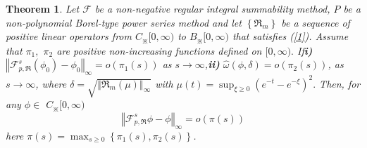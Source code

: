 \documentclass{amsart}
\newtheorem{theorem}{Theorem}
\theoremstyle{plain}
\numberwithin{equation}{section}
\begin{document}
\begin{theorem}
\label{rate2} Let $\mathcal{F}
$ be a non-negative regular integral summability method, $P$ be a non-polynomial Borel-type power series method and let $\left\{  \Re_{m}\right\}
$ be a sequence of positive linear operators from $C_{\divideontimes}%
[0,\infty)$ to $B_{\divideontimes}[0,\infty)$ that satisfies (\ref{1}). Assume
that $\pi_{1},$ $\pi_{2}$ are positive non-increasing functions defined
on $[0,\infty).$ If\newline \textbf{i)} $\left \Vert
\mathcal{F}
_{p,\Re}^{s}\left(  \phi_{0}\right)  -\phi_{0}\right \Vert _{\infty}=o(\pi
_{1}(s))$ as $s\rightarrow \infty$,\newline \textbf{ii)} $\hat{\omega}(\phi
,\delta)=o(\pi_{2}(s))$, as $s\rightarrow \infty$, where $\delta=\sqrt{\left \Vert
\Re_{m}\left(  \mu\right)  \right \Vert _{\infty}}$ with
$\mu(t)=\displaystyle \sup_{\xi \geq0}\left(  e^{-t}-e^{-\xi
}\right)  ^{2}.$ Then, for any $\phi \in$ $C_{\divideontimes}[0,\infty)$%
\[
\left \Vert
\mathcal{F}%
_{p,\Re}^{s}\phi-\phi \right \Vert _{\infty}=o(\pi(s))
\]
here $\pi(s)=\displaystyle\max_{s\geq0}\left \{  \pi_{1}(s),\pi_{2}(s)\right \}  $.
\end{theorem}
\end{document}

